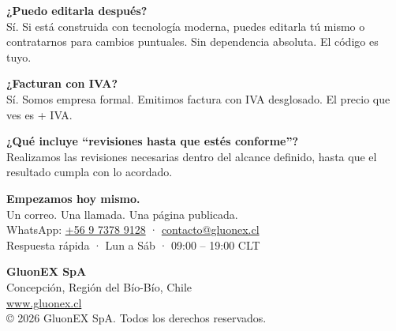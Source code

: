 \documentclass[11pt, a4paper]{article}
\begin{document}
  \noindent
  \textbf{\color{darkslate}
  ¿Puedo editarla después?} \\[1mm] {\small\color{basicgray}Sí. Si está construida con tecnología moderna, puedes editarla tú mismo o contratarnos para cambios puntuales. Sin dependencia absoluta. El código es tuyo.}

  \vspace{3mm}

  \noindent
  \textbf{\color{darkslate}
  ¿Facturan con IVA?} \\[1mm]
  {\small\color{basicgray}Sí. Somos empresa formal. Emitimos factura con IVA desglosado. El precio que ves es + IVA.}

  \vspace{3mm}

  \noindent
  \textbf{\color{darkslate}
  ¿Qué incluye ``revisiones hasta que estés conforme''?} \\[1mm] {\small\color{basicgray}Realizamos las revisiones necesarias dentro del alcance definido, hasta que el resultado cumpla con lo acordado.}

  \vspace{8mm}

  \begin{tcolorbox}
    [colback=darkslate, colframe=darkslate, arc=3mm, boxrule=0pt, left=8mm, right=8mm,
    top=6mm, bottom=6mm]
    \color{white}
    \begin{center}
      {\Large\bfseries Empezamos hoy mismo.} \\[2mm] {\small Un correo. Una llamada. Una página publicada.}
      \\[4mm] {\small\color{gray}WhatsApp: \href{https://wa.me/56973789128}{+56 9 7378 9128} · \href{mailto:contacto@gluonex.cl}{contacto@gluonex.cl}}
      \\[1mm] {\footnotesize\color{gray}Respuesta rápida · Lun a Sáb · 09:00 -- 19:00 CLT}
    \end{center}
  \end{tcolorbox}

  \vspace{8mm}

  \begin{center}
    \color{gray}
    \small \textbf{GluonEX SpA} \\ Concepción, Región del Bío-Bío, Chile \\
    \href{https://gluonex.cl}{www.gluonex.cl} \\[2mm]
    {\footnotesize © 2026 GluonEX SpA. Todos los derechos reservados.}
  \end{center}
\end{document}
